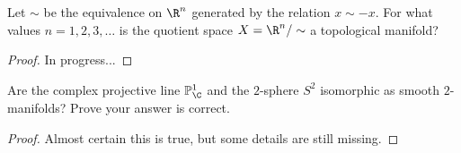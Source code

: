\documentclass[10pt]{amsart}
\begin{document}
\begin{thm}\label{ex4}
  Let $\sim$ be the equivalence on $\R^n$ generated by the relation $x \sim -x$.
  For what values $n = 1,2,3,\ldots$ is the quotient space $X = \R^n/\sim$ a topological manifold?
  
  \begin{proof}
	In progress...
  \end{proof}
\end{thm}

\begin{thm}\label{ex5}
  Are the complex projective line $\mathbb{P}_\C^1$ and the $2$-sphere $S^2$ isomorphic as smooth $2$-manifolds?
  Prove your answer is correct.

  \begin{proof}
	Almost certain this is true, but some details are still missing.
  \end{proof}
\end{thm}
\end{document}

